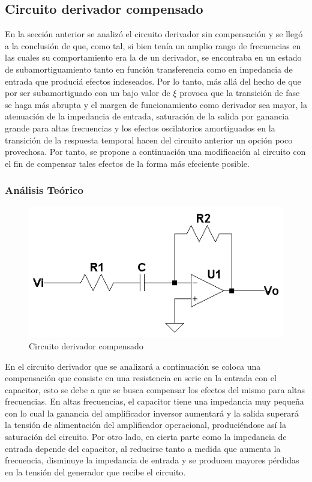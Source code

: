 	\subsection{Circuito derivador compensado}
En la secci\'on anterior se analiz\'o el circuito derivador sin compensaci\'on y se lleg\'o a la conclusi\'on de que, como tal,
si bien ten\'ia un amplio rango de frecuencias en las cuales su comportamiento era la de un derivador, se encontraba en un estado de subamortiguamiento
tanto en funci\'on transferencia como en impedancia de entrada que produci\'a efectos indeseados. Por lo tanto, m\'as all\'a del hecho de que por ser subamortiguado con un bajo
valor de $\xi$ provoca que la transici\'on de fase se haga m\'as abrupta y el margen de funcionamiento como derivador sea mayor, la atenuaci\'on de la impedancia de entrada, saturaci\'on de la salida por ganancia
grande para altas frecuencias y los efectos oscilatorios amortiguados en la transici\'on de la respuesta temporal hacen del circuito anterior un opci\'on poco provechosa.
Por tanto, se propone a continuaci\'on una modificaci\'on al circuito con el fin de compensar tales efectos de la forma m\'as efeciente posible.

\subsubsection{An\'alisis Te\'orico}

\begin{figure}[H]
	\centering
	\includegraphics[scale=0.7]{../EJ4/Recursos/Derivador_compensado/Circuito_derivador_compensado.png}
	\caption{Circuito derivador compensado}
	\label{fig:derivador_compensado_circuito}
\end{figure}

En el circuito derivador que se analizar\'a a continuaci\'on se coloca una compensaci\'on 
que consiste en una resistencia en serie en la entrada con el capacitor, esto se debe a que 
se busca compensar los efectos del mismo para altas frecuencias. En altas frecuencias, el 
capacitor tiene una impedancia muy peque\~na con lo cual la ganancia del amplificador 
inversor aumentar\'a y la salida superar\'a la tensi\'on de alimentaci\'on del 
amplificador operacional, produci\'endose as\'i la saturaci\'on del circuito. 
Por otro lado, en cierta parte como la impedancia de entrada depende del capacitor, al 
reducirse tanto a medida que aumenta la frecuencia, disminuye la impedancia de entrada 
y se producen mayores p\'erdidas en la tensi\'on del generador que recibe el circuito.

